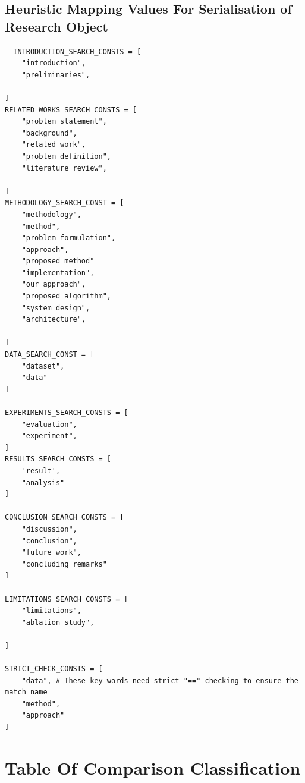 \section{Heuristic Mapping Values For Serialisation of Research Object}
\label{appendix:mapping-heuristic}
\begin{lstlisting}
  INTRODUCTION_SEARCH_CONSTS = [
    "introduction",
    "preliminaries",
    
]
RELATED_WORKS_SEARCH_CONSTS = [
    "problem statement",
    "background",
    "related work",
    "problem definition",
    "literature review",

]
METHODOLOGY_SEARCH_CONST = [
    "methodology",
    "method",
    "problem formulation",
    "approach",
    "proposed method"
    "implementation",
    "our approach",
    "proposed algorithm",
    "system design",
    "architecture",

]
DATA_SEARCH_CONST = [
    "dataset",
    "data"
]

EXPERIMENTS_SEARCH_CONSTS = [
    "evaluation",
    "experiment",
]
RESULTS_SEARCH_CONSTS = [
    'result',
    "analysis"
]

CONCLUSION_SEARCH_CONSTS = [
    "discussion",
    "conclusion",
    "future work",
    "concluding remarks"
]

LIMITATIONS_SEARCH_CONSTS = [
    "limitations",
    "ablation study",

]

STRICT_CHECK_CONSTS = [
    "data", # These key words need strict "==" checking to ensure the match name
    "method",
    "approach"
]
\end{lstlisting}

\chapter{Table Of Comparison Classification}
\label{appendix:toc}
